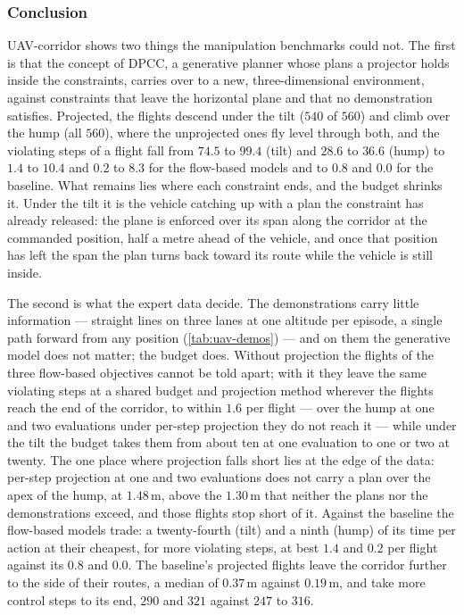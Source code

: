 \subsubsection{Conclusion}\label{sec:res:uav:corridor:conclusion}

UAV-corridor shows two things the manipulation benchmarks could not. The first is that the concept of
\ac{DPCC}, a generative planner whose plans a projector holds inside the constraints, carries over to a new,
three-dimensional environment, against constraints that leave the horizontal plane and that no demonstration
satisfies. Projected, the flights descend under the tilt ($540$ of $560$) and climb over the hump (all $560$),
where the unprojected ones fly level through both, and the violating steps of a flight fall from $74.5$ to
$99.4$ (tilt) and $28.6$ to $36.6$ (hump) to $1.4$ to $10.4$ and $0.2$ to $8.3$ for the flow-based models and
to $0.8$ and $0.0$ for the baseline. What remains lies where each constraint ends, and the budget shrinks it.
Under the tilt it is the vehicle catching up with a plan the constraint has already released: the plane is
enforced over its span along the corridor at the commanded position, half a metre ahead of the vehicle, and
once that position has left the span the plan turns back toward its route while the vehicle is still inside.

The second is what the expert data decide. The demonstrations carry little information --- straight lines on
three lanes at one altitude per episode, a single path forward from any position (\autoref{tab:uav-demos})
--- and on them the generative model does not matter; the budget does. Without projection the flights of the
three flow-based objectives cannot be told apart; with it they leave the same violating steps at a shared
budget and projection method wherever the flights reach the end of the corridor, to within $1.6$ per flight
--- over the hump at one and two evaluations under per-step projection they do not reach it --- while under
the tilt the budget takes them from
about ten at one evaluation to one or two at twenty. The one place where projection falls short lies at the
edge of the data: per-step projection at one and two evaluations does not carry a plan over the apex of the
hump, at $1.48$\,m, above the $1.30$\,m that neither the plans nor the demonstrations exceed, and those flights
stop short of it. Against the baseline the flow-based models trade: a twenty-fourth (tilt) and a ninth (hump)
of its time per action at their cheapest, for more violating steps, at best $1.4$ and $0.2$ per flight against its
$0.8$ and $0.0$. The baseline's projected flights leave the corridor further to the side of their routes, a
median of $0.37$\,m against $0.19$\,m, and take more control steps to its end, $290$ and $321$ against $247$ to
$316$.

